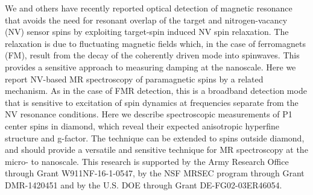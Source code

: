 We and others \cite{Wolfe_2014,van_der_Sar_2015,Du_2017} have recently reported optical detection of magnetic resonance that avoids the need for resonant overlap of the target and nitrogen-vacancy (NV) sensor spins by exploiting target-spin induced NV spin relaxation. The relaxation is due to fluctuating magnetic fields which, in the case of ferromagnets (FM), result from the decay of the coherently driven mode into spinwaves. This provides a sensitive approach to measuring damping at the nanoscale.  Here we report NV-based MR spectroscopy of paramagnetic spins by a related mechanism.  As in the case of FMR detection, this is a broadband detection mode that is sensitive to excitation of spin dynamics at frequencies separate from the NV resonance conditions.  Here we describe spectroscopic measurements of P1 center spins in diamond, which reveal their expected anisotropic hyperfine structure and g-factor.   The technique can be extended to spins outside diamond, and should provide a versatile and sensitive technique for MR spectroscopy at the micro- to nanoscale.  This research is supported by the Army Research Office through Grant W911NF-16-1-0547, by the NSF MRSEC program through Grant DMR-1420451 and by the U.S. DOE through Grant DE-FG02-03ER46054.
